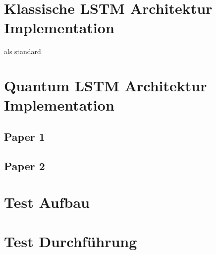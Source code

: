 \section{Klassische LSTM Architektur Implementation}
als standard

\section{Quantum LSTM Architektur Implementation}
\subsection{Paper 1}
\subsection{Paper 2}

\section{Test Aufbau}

\section{Test Durchführung}
